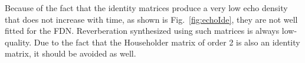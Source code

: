 \documentclass[twoside,a4paper]{article}
\begin{document}
Because of the fact that the identity matrices produce a very low echo density that does not increase with time, as shown is Fig.~\ref{fig:echoIde}, they are not well fitted for the FDN. Reverberation synthesized using such matrices is always low-quality.  Due to the fact that the Householder matrix of order 2 is also an identity matrix, it should be avoided as well.
\begin{figure}[ht!]
    \centering
    \hfill
     \hfill
     \hfill

\end{figure}
\end{document}
